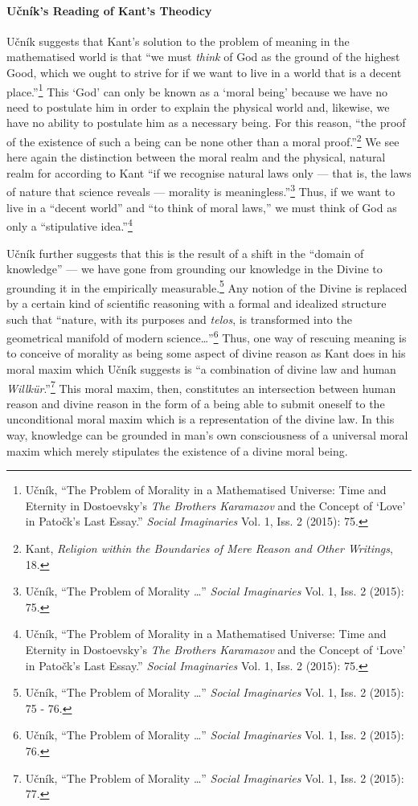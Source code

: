 \documentclass[12pt]{article}
\begin{document}
	\paragraph*{U\v{c}n\'{i}k's Reading of Kant's Theodicy}  U\v{c}n\'{i}k suggests that Kant's solution to the problem of meaning in the mathematised world is that ``we must \emph{think} of God as the ground of the highest Good, which we ought to strive for if we want to live in a world that is a decent place.''\footnote{U\v{c}n\'{i}k, ``The Problem of Morality in a Mathematised Universe: Time and Eternity in Dostoevsky's \emph{The Brothers Karamazov} and the Concept of `Love' in Pato\v{c}k's Last Essay.'' \emph{Social Imaginaries} Vol. 1, Iss. 2 (2015): 75.} This `God' can only be known as a `moral being' because we have no need to postulate him in order to explain the physical world and, likewise, we have no ability to postulate him as a necessary being. For this reason, ``the proof of the existence of such a being can be none other than a moral proof.''\footnote{Kant, \emph{Religion within the Boundaries of Mere Reason and Other Writings}, 18.} We see here again the distinction between the moral realm and the physical, natural realm for according to Kant ``if we recognise natural laws only --- that is, the laws of nature that science reveals --- morality is meaningless.''\footnote{U\v{c}n\'{i}k, ``The Problem of Morality \ldots'' \emph{Social Imaginaries} Vol. 1, Iss. 2 (2015): 75.} Thus, if we want to live in a ``decent world'' and ``to think of moral laws,'' we must think of God as only a ``stipulative idea.''\footnote{U\v{c}n\'{i}k, ``The Problem of Morality in a Mathematised Universe: Time and Eternity in Dostoevsky's \emph{The Brothers Karamazov} and the Concept of `Love' in Pato\v{c}k's Last Essay.'' \emph{Social Imaginaries} Vol. 1, Iss. 2 (2015): 75.} 
	
	U\v{c}n\'{i}k further suggests that this is the result of a shift in the ``domain of knowledge'' --- we have gone from grounding our knowledge in the Divine to grounding it in the empirically measurable.\footnote{U\v{c}n\'{i}k, ``The Problem of Morality \ldots'' \emph{Social Imaginaries} Vol. 1, Iss. 2 (2015): 75 - 76.} Any notion of the Divine is replaced by a certain kind of scientific reasoning with a formal and idealized structure such that ``nature, with its purposes and \emph{telos}, is transformed into the geometrical manifold of modern science\ldots''\footnote{U\v{c}n\'{i}k, ``The Problem of Morality \ldots'' \emph{Social Imaginaries} Vol. 1, Iss. 2 (2015): 76.} Thus, one way of rescuing meaning is to conceive of morality as being some aspect of divine reason as Kant does in his moral maxim which U\v{c}n\'{i}k suggests is ``a combination of divine law and human \emph{Willk\"{u}r}.''\footnote{U\v{c}n\'{i}k, ``The Problem of Morality \ldots'' \emph{Social Imaginaries} Vol. 1, Iss. 2 (2015): 77.} This moral maxim, then, constitutes an intersection between human reason and divine reason in the form of a being able to submit oneself to the unconditional moral maxim which is a representation of the divine law. In this way, knowledge can be grounded in man's own consciousness of a universal moral maxim which merely stipulates the existence of a divine moral being.
	
\end{document}
